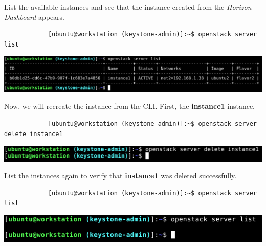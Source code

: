 \documentclass[letterpaper, 12pt]{article}
\begin{document}
\begin{enumerate}
    \begin{labstep}
        List the available instances and see that the instance created from the \textit{Horizon Dashboard} appears.
        \begin{lstlisting}
            [ubuntu@workstation (keystone-admin)]:~$ openstack server list
        \end{lstlisting}

        \begin{center}
            \includegraphics[width=\linewidth]{images/part4/step9.png}
        \end{center}
    \end{labstep}

    \begin{labstep}
        Now, we will recreate the instance from the CLI.
        First, the \textbf{instance1} instance.
        \begin{lstlisting}
            [ubuntu@workstation (keystone-admin)]:~$ openstack server delete instance1
        \end{lstlisting}

        \begin{center}
            \includegraphics[width=\linewidth]{images/part4/step10.png}
        \end{center}
    \end{labstep}

    \begin{labstep}
        List the instances again to verify that \textbf{instance1} was deleted successfully.
        \begin{lstlisting}
            [ubuntu@workstation (keystone-admin)]:~$ openstack server list
        \end{lstlisting}

        \begin{center}
            \includegraphics[width=\linewidth]{images/part4/step11.png}
        \end{center}
    \end{labstep}


\end{enumerate}
\end{document}
